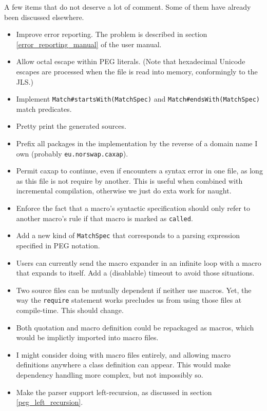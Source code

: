 A few items that do not deserve a lot of comment. Some of them have already been
discussed elsewhere.

\begin{itemize}

\item Improve error reporting. The problem is described in section
  \ref{error_reporting_manual} of the user manual.

\item Allow octal escape within PEG literals. (Note that hexadecimal Unicode
  escapes are processed when the file is read into memory, conformingly to the
  JLS.)

\item Implement \lstinline{Match#startsWith(MatchSpec)} and
  \lstinline{Match#endsWith(MatchSpec)} match predicates.

\item Pretty print the generated sources.

\item Prefix all packages in the implementation by the reverse of a domain name
  I own (probably \texttt{eu.norswap.caxap}).

\item Permit caxap to continue, even if encounters a syntax error in one file,
  as long as this file is not require by another. This is useful when combined
  with incremental compilation, otherwise we just do exta work for naught.

\item Enforce the fact that a macro's syntactic specification should only refer
  to another macro's rule if that macro is marked as \texttt{called}.

\item Add a new kind of \texttt{MatchSpec} that corresponds to a parsing
  expression specified in PEG notation.

\item Users can currently send the macro expander in an infinite loop with a
  macro that expands to itself. Add a (disablable) timeout to avoid those
  situations.

\item Two source files can be mutually dependent if neither use macros. Yet, the
  way the \texttt{require} statement works precludes us from using those files
  at compile-time. This should change.

\item Both quotation and macro definition could be repackaged as macros, which
  would be implictly imported into macro files.

\item I might consider doing with macro files entirely, and allowing macro
  definitions anywhere a class definition can appear. This would make dependency
  handling more complex, but not impossibly so.

\item Make the parser support left-recursion, as discussed in section
  \ref{peg_left_recursion}.

\end{itemize}
